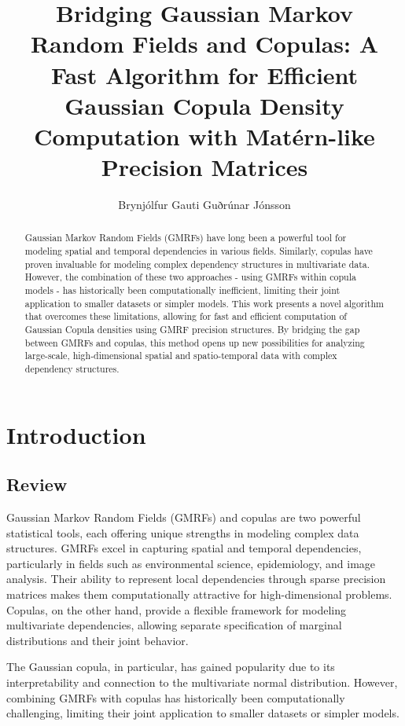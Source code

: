 \documentclass[journal=,manuscript=]{achemso}
\author{Brynjólfur Gauti Guðrúnar Jónsson}
\affiliation{ University of Iceland,  }
\title[]{Bridging Gaussian Markov Random Fields and Copulas: A Fast
Algorithm for Efficient Gaussian Copula Density Computation with
Matérn-like Precision Matrices}
\begin{document}
\maketitle
\begin{abstract}
Gaussian Markov Random Fields (GMRFs) have long been a powerful tool for
modeling spatial and temporal dependencies in various fields. Similarly,
copulas have proven invaluable for modeling complex dependency
structures in multivariate data. However, the combination of these two
approaches - using GMRFs within copula models - has historically been
computationally inefficient, limiting their joint application to smaller
datasets or simpler models. This work presents a novel algorithm that
overcomes these limitations, allowing for fast and efficient computation
of Gaussian Copula densities using GMRF precision structures. By
bridging the gap between GMRFs and copulas, this method opens up new
possibilities for analyzing large-scale, high-dimensional spatial and
spatio-temporal data with complex dependency structures.
\end{abstract}


\section{Introduction}\label{introduction}

\subsection{Review}\label{review}

Gaussian Markov Random Fields (GMRFs) and copulas are two powerful
statistical tools, each offering unique strengths in modeling complex
data structures. GMRFs excel in capturing spatial and temporal
dependencies, particularly in fields such as environmental science,
epidemiology, and image analysis. Their ability to represent local
dependencies through sparse precision matrices makes them
computationally attractive for high-dimensional problems. Copulas, on
the other hand, provide a flexible framework for modeling multivariate
dependencies, allowing separate specification of marginal distributions
and their joint behavior.

The Gaussian copula, in particular, has gained popularity due to its
interpretability and connection to the multivariate normal distribution.
However, combining GMRFs with copulas has historically been
computationally challenging, limiting their joint application to smaller
datasets or simpler models.
\end{document}
